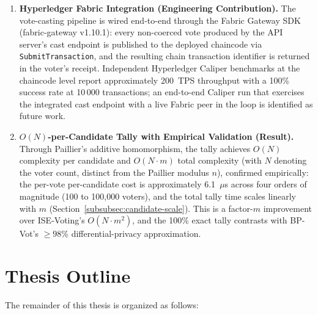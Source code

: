 \begin{enumerate}
    \item \textbf{Hyperledger Fabric Integration (Engineering Contribution).} The vote-casting pipeline is wired end-to-end through the Fabric Gateway SDK (fabric-gateway v1.10.1): every non-coerced vote produced by the API server's cast endpoint is published to the deployed chaincode via \texttt{SubmitTransaction}, and the resulting chain transaction identifier is returned in the voter's receipt. Independent Hyperledger Caliper benchmarks at the chaincode level report approximately 200~TPS throughput with a 100\% success rate at 10\,000 transactions; an end-to-end Caliper run that exercises the integrated cast endpoint with a live Fabric peer in the loop is identified as future work.

    \item \textbf{$O(N)$-per-Candidate Tally with Empirical Validation (Result).} Through Paillier's additive homomorphism, the tally achieves $O(N)$ complexity per candidate and $O(N \cdot m)$ total complexity (with $N$ denoting the voter count, distinct from the Paillier modulus $n$), confirmed empirically: the per-vote per-candidate cost is approximately 6.1~$\mu$s across four orders of magnitude (100 to 100{,}000 voters), and the total tally time scales linearly with $m$ (Section~\ref{subsubsec:candidate-scale}). This is a factor-$m$ improvement over ISE-Voting's $O(N \cdot m^{2})$, and the 100\% exact tally contrasts with BP-Vot's $\geq 98\%$ differential-privacy approximation.
\end{enumerate}

\section{Thesis Outline}
\label{sec:outline}

The remainder of this thesis is organized as follows:

